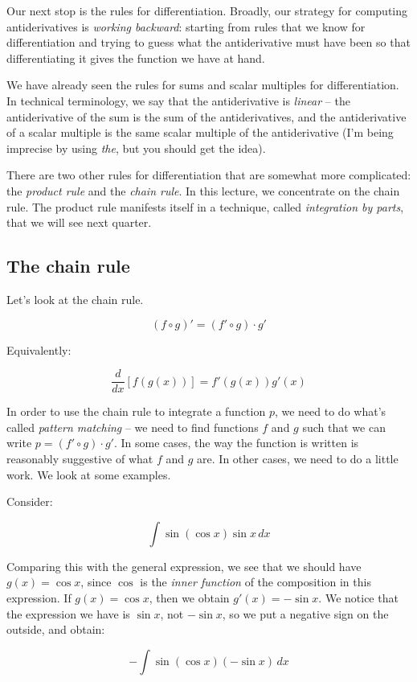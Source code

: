 \documentclass{amsart}
\begin{document}
Our next stop is the rules for differentiation. Broadly, our strategy
for computing antiderivatives is {\em working backward}: starting from
rules that we know for differentiation and trying to guess what the
antiderivative must have been so that differentiating it gives the
function we have at hand.

We have already seen the rules for sums and scalar multiples for
differentiation. In technical terminology, we say that the
antiderivative is {\em linear} -- the antiderivative of the sum is the
sum of the antiderivatives, and the antiderivative of a scalar
multiple is the same scalar multiple of the antiderivative (I'm being
imprecise by using {\em the}, but you should get the idea).

There are two other rules for differentiation that are somewhat more
complicated: the {\em product rule} and the {\em chain rule}. In this
lecture, we concentrate on the chain rule. The product rule manifests
itself in a technique, called {\em integration by parts}, that we will
see next quarter.

\subsection{The chain rule}

Let's look at the chain rule.

$$(f \circ g)' = (f' \circ g) \cdot g'$$

Equivalently:

$$\frac{d}{dx}[f(g(x))] = f'(g(x))g'(x)$$

In order to use the chain rule to integrate a function $p$, we need to
do what's called {\em pattern matching} -- we need to find functions
$f$ and $g$ such that we can write $p = (f' \circ g) \cdot g'$. In
some cases, the way the function is written is reasonably suggestive
of what $f$ and $g$ are. In other cases, we need to do a little
work. We look at some examples.

Consider:

$$\int \sin (\cos x) \sin x \, dx$$

Comparing this with the general expression, we see that we should have
$g(x) = \cos x$, since $\cos$ is the {\em inner function} of the
composition in this expression. If $g(x) = \cos x$, then we obtain
$g'(x) = -\sin x$. We notice that the expression we have is $\sin x$,
not $-\sin x$, so we put a negative sign on the outside, and obtain:

$$- \int \sin(\cos x) (- \sin x) \, dx$$
\end{document}

